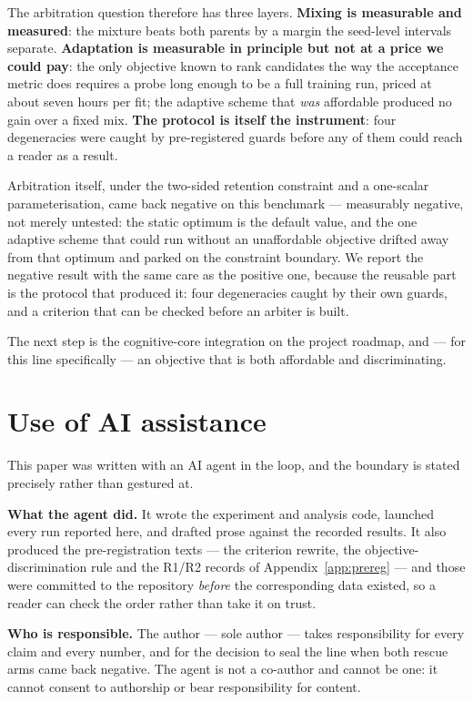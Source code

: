\documentclass[11pt]{article}
\begin{document}
The arbitration question therefore has three layers.
\textbf{Mixing is measurable and measured}: the mixture beats both parents by a margin the
seed-level intervals separate. \textbf{Adaptation is measurable in principle but not at a price we
could pay}: the only objective known to rank candidates the way the acceptance metric does requires
a probe long enough to be a full training run, priced at about seven hours per fit; the adaptive
scheme that \emph{was} affordable produced no gain over a fixed mix.
\textbf{The protocol is itself the instrument}: four degeneracies were caught by pre-registered
guards before any of them could reach a reader as a result.

Arbitration itself, under the two-sided retention constraint and a one-scalar parameterisation,
came back negative on this benchmark --- measurably negative, not merely untested: the static
optimum is the default value, and the one adaptive scheme that could run without an unaffordable
objective drifted away from that optimum and parked on the constraint boundary. We report the
negative result with the same care as the positive one, because the reusable part is the protocol
that produced it: four degeneracies caught by their own guards, and a criterion that can be
checked before an arbiter is built.

The next step is the cognitive-core integration on the project roadmap, and --- for this line
specifically --- an objective that is both affordable and discriminating.

\section*{Use of AI assistance}

This paper was written with an AI agent in the loop, and the boundary is stated precisely rather
than gestured at.

\textbf{What the agent did.} It wrote the experiment and analysis code, launched every run
reported here, and drafted prose against the recorded results. It also produced the
pre-registration texts --- the criterion rewrite, the objective-discrimination rule and the R1/R2
records of Appendix~\ref{app:prereg} --- and those were committed to the repository
\emph{before} the corresponding data existed, so a reader can check the order rather than take it
on trust.

\textbf{Who is responsible.} The author --- sole author --- takes responsibility for every claim
and every number, and for the decision to seal the line when both rescue arms came back negative.
The agent is not a co-author and cannot be one: it cannot consent to authorship or bear
responsibility for content.
\end{document}
